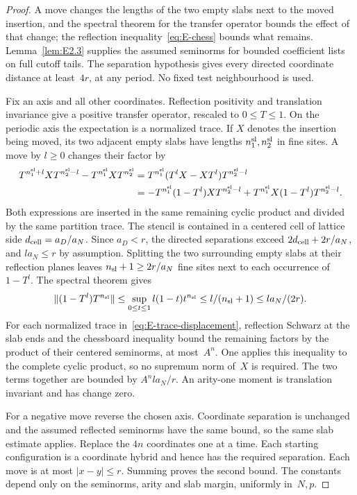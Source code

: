 \begin{proof}
A move changes the lengths of the two empty slabs next to the moved insertion, and the spectral theorem for the transfer operator bounds the effect of that change; the reflection inequality~\eqref{eq:E-chess} bounds what remains. Lemma~\ref{lem:E2.3} supplies the assumed seminorms for bounded coefficient lists on full cutoff tails. The separation hypothesis gives every directed coordinate distance at least~$4r$, at any period. No fixed test neighbourhood is used.

Fix an axis and all other coordinates. Reflection positivity and translation invariance give a positive transfer operator, rescaled to $0\le T\le1$. On the periodic axis the expectation is a normalized trace. If $X$ denotes the insertion being moved, its two adjacent empty slabs have lengths $n_1^{\rm sl},n_2^{\rm sl}$ in fine sites. A move by $l\ge0$ changes their factor by
\begin{align}\label{eq:E-trace-displacement}
 T^{n_1^{\rm sl}+l}XT^{n_2^{\rm sl}-l}-T^{n_1^{\rm sl}}XT^{n_2^{\rm sl}}
 &=T^{n_1^{\rm sl}}(T^lX-XT^l)T^{n_2^{\rm sl}-l}\notag\\
 &=-T^{n_1^{\rm sl}}(1-T^l)XT^{n_2^{\rm sl}-l}
   +T^{n_1^{\rm sl}}X(1-T^l)T^{n_2^{\rm sl}-l}.
\end{align}
Both expressions are inserted in the same remaining cyclic product and divided by the same partition trace. The stencil is contained in a centered cell of lattice side $d_{\rm cell}=a_D/a_N$. Since $a_D<r$, the directed separations exceed $2d_{\rm cell}+2r/a_N$, and $la_N\le r$ by assumption. Splitting the two surrounding empty slabs at their reflection planes leaves $n_{\rm sl}+1\ge2r/a_N$ fine sites next to each occurrence of $1-T^l$. The spectral theorem gives
\begin{equation*}
 \|(1-T^l)T^{n_{\rm sl}}\|
 \le\sup_{0\le t\le1}l(1-t)t^{n_{\rm sl}}
 \le l/(n_{\rm sl}+1)\le la_N/(2r).
\end{equation*}
For each normalized trace in~\eqref{eq:E-trace-displacement}, reflection Schwarz at the slab ends and the chessboard inequality bound the remaining factors by the product of their centered seminorms, at most~$A^n$. One applies this inequality to the complete cyclic product, so no supremum norm of~$X$ is required. The two terms together are bounded by $A^nla_N/r$. An arity-one moment is translation invariant and has change zero.

For a negative move reverse the chosen axis. Coordinate separation is unchanged and the assumed reflected seminorms have the same bound, so the same slab estimate applies. Replace the $4n$ coordinates one at a time. Each starting configuration is a coordinate hybrid and hence has the required separation. Each move is at most $|x-y|\le r$. Summing proves the second bound. The constants depend only on the seminorms, arity and slab margin, uniformly in~$N,p$.
\end{proof}

